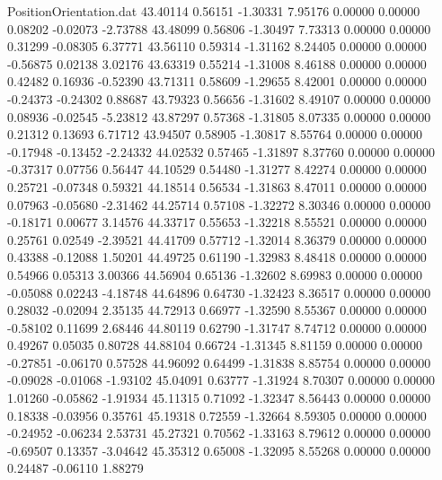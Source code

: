\begin{filecontents}{PositionOrientation.dat}
  43.40114    0.56151   -1.30331     7.95176    0.00000    0.00000    0.08202   -0.02073   -2.73788
  43.48099    0.56806   -1.30497     7.73313    0.00000    0.00000    0.31299   -0.08305    6.37771
  43.56110    0.59314   -1.31162     8.24405    0.00000    0.00000   -0.56875    0.02138    3.02176
  43.63319    0.55214   -1.31008     8.46188    0.00000    0.00000    0.42482    0.16936   -0.52390
  43.71311    0.58609   -1.29655     8.42001    0.00000    0.00000   -0.24373   -0.24302    0.88687
  43.79323    0.56656   -1.31602     8.49107    0.00000    0.00000    0.08936   -0.02545   -5.23812
  43.87297    0.57368   -1.31805     8.07335    0.00000    0.00000    0.21312    0.13693    6.71712
  43.94507    0.58905   -1.30817     8.55764    0.00000    0.00000   -0.17948   -0.13452   -2.24332
  44.02532    0.57465   -1.31897     8.37760    0.00000    0.00000   -0.37317    0.07756    0.56447
  44.10529    0.54480   -1.31277     8.42274    0.00000    0.00000    0.25721   -0.07348    0.59321
  44.18514    0.56534   -1.31863     8.47011    0.00000    0.00000    0.07963   -0.05680   -2.31462
  44.25714    0.57108   -1.32272     8.30346    0.00000    0.00000   -0.18171    0.00677    3.14576
  44.33717    0.55653   -1.32218     8.55521    0.00000    0.00000    0.25761    0.02549   -2.39521
  44.41709    0.57712   -1.32014     8.36379    0.00000    0.00000    0.43388   -0.12088    1.50201
  44.49725    0.61190   -1.32983     8.48418    0.00000    0.00000    0.54966    0.05313    3.00366
  44.56904    0.65136   -1.32602     8.69983    0.00000    0.00000   -0.05088    0.02243   -4.18748
  44.64896    0.64730   -1.32423     8.36517    0.00000    0.00000    0.28032   -0.02094    2.35135
  44.72913    0.66977   -1.32590     8.55367    0.00000    0.00000   -0.58102    0.11699    2.68446
  44.80119    0.62790   -1.31747     8.74712    0.00000    0.00000    0.49267    0.05035    0.80728
  44.88104    0.66724   -1.31345     8.81159    0.00000    0.00000   -0.27851   -0.06170    0.57528
  44.96092    0.64499   -1.31838     8.85754    0.00000    0.00000   -0.09028   -0.01068   -1.93102
  45.04091    0.63777   -1.31924     8.70307    0.00000    0.00000    1.01260   -0.05862   -1.91934
  45.11315    0.71092   -1.32347     8.56443    0.00000    0.00000    0.18338   -0.03956    0.35761
  45.19318    0.72559   -1.32664     8.59305    0.00000    0.00000   -0.24952   -0.06234    2.53731
  45.27321    0.70562   -1.33163     8.79612    0.00000    0.00000   -0.69507    0.13357   -3.04642
  45.35312    0.65008   -1.32095     8.55268    0.00000    0.00000    0.24487   -0.06110    1.88279

\end{filecontents}
